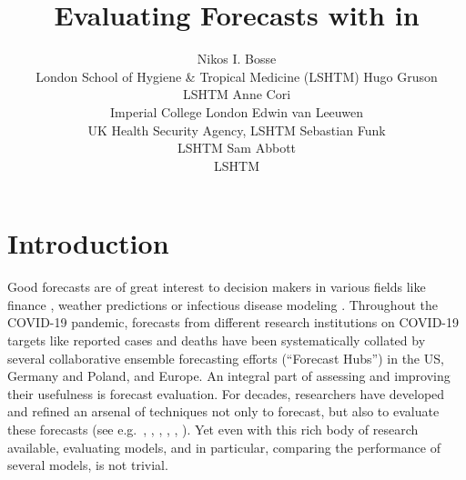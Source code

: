 \documentclass[
]{jss}
\author{
Nikos I. Bosse\\London School of Hygiene \& Tropical Medicine (LSHTM)
\AND Hugo Gruson\\LSHTM \And Anne Cori\\Imperial College London
\AND Edwin van Leeuwen\\UK Health Security Agency,
LSHTM \And Sebastian Funk\\LSHTM \And Sam Abbott\\LSHTM
}
\title{Evaluating Forecasts with \pkg{scoringutils} in \proglang{R}}
\begin{document}
\hypertarget{introduction}{%
\section{Introduction}\label{introduction}}

Good forecasts are of great interest to decision makers in various
fields like finance
\citep{timmermannForecastingMethodsFinance2018, elliottForecastingEconomicsFinance2016},
weather predictions
\citep{gneitingWeatherForecastingEnsemble2005, kukkonenReviewOperationalRegionalscale2012}
or infectious disease modeling
\citep{reichCollaborativeMultiyearMultimodel2019, funkShorttermForecastsInform2020, cramerEvaluationIndividualEnsemble2021, bracherShorttermForecastingCOVID192021, europeancovid-19forecasthubEuropeanCovid19Forecast2021}.
Throughout the COVID-19 pandemic, forecasts from different research
institutions on COVID-19 targets like reported cases and deaths have
been systematically collated by several collaborative ensemble
forecasting efforts (``Forecast Hubs'') in the US, Germany and Poland,
and Europe. An integral part of assessing and improving their usefulness
is forecast evaluation. For decades, researchers have developed and
refined an arsenal of techniques not only to forecast, but also to
evaluate these forecasts (see e.g.~\cite{goodRationalDecisions1952},
\cite{epsteinScoringSystemProbability1969, murphyNoteRankedProbability1971a, mathesonScoringRulesContinuous1976},
\cite{gneitingProbabilisticForecastsCalibration2007},
\cite{funkAssessingPerformanceRealtime2019},
\cite{gneitingStrictlyProperScoring2007},
\cite{bracherEvaluatingEpidemicForecasts2021}). Yet even with this rich
body of research available, evaluating models, and in particular,
comparing the performance of several models, is not trivial.
\end{document}
